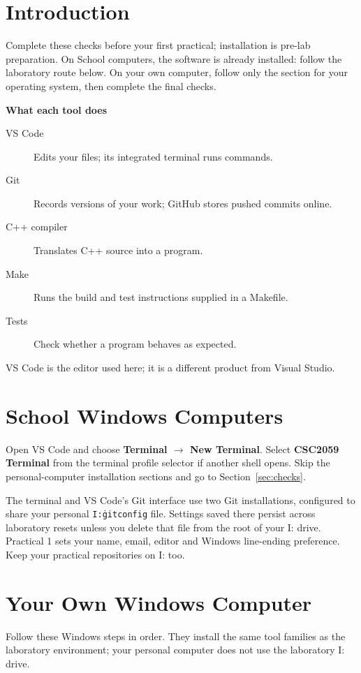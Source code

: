 \documentclass{csc2059practical}
\begin{document}
\maketitle

\section{Introduction}

Complete these checks before your first practical; installation is pre-lab preparation. On School computers, the software is already installed: follow the laboratory route below. On your own computer, follow only the section for your operating system, then complete the final checks.

\begin{infobox}
\textbf{What each tool does}
\begin{description}
\item[VS Code] Edits your files; its integrated terminal runs commands.
\item[Git] Records versions of your work; GitHub stores pushed commits online.
\item[C++ compiler] Translates C++ source into a program.
\item[Make] Runs the build and test instructions supplied in a Makefile.
\item[Tests] Check whether a program behaves as expected.
\end{description}
VS Code is the editor used here; it is a different product from Visual Studio.
\end{infobox}

\section{School Windows Computers}
Open VS Code and choose \textbf{Terminal $\rightarrow$ New Terminal}. Select \textbf{CSC2059 Terminal} from the terminal profile selector if another shell opens. Skip the personal-computer installation sections and go to Section~\ref{sec:checks}.

The terminal and VS Code's Git interface use two Git installations, configured to share your personal \texttt{I:\.gitconfig} file. Settings saved there persist across laboratory resets unless you delete that file from the root of your I: drive. Practical 1 sets your name, email, editor and Windows line-ending preference. Keep your practical repositories on I: too.

\section{Your Own Windows Computer}
Follow these Windows steps in order. They install the same tool families as the laboratory environment; your personal computer does not use the laboratory I: drive.
\end{document}
